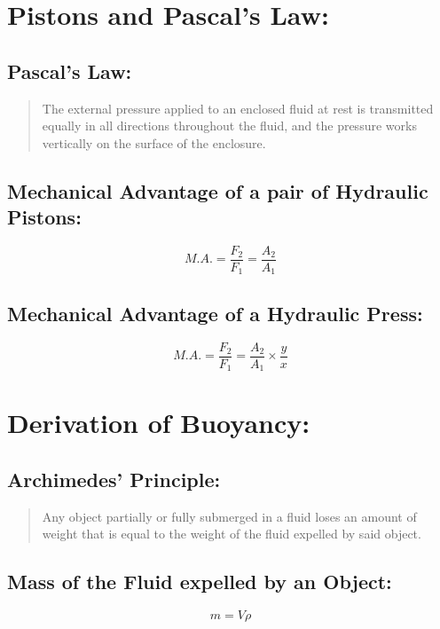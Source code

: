 \documentclass[a4paper]{report}
\begin{document}
    \section{Pistons and Pascal's Law: }
        \subsection{Pascal's Law: }
            \begin{quotation}
                The external pressure applied to an enclosed fluid at rest is transmitted equally in all directions throughout the fluid, and the pressure works vertically on the surface of the enclosure.
            \end{quotation}
        \subsection{Mechanical Advantage of a pair of Hydraulic Pistons: }
            \begin{equation}
                M.A. = \frac{F_2}{F_1} = \frac{A_2}{A_1}
            \end{equation}
        \subsection{Mechanical Advantage of a Hydraulic Press: }
            \begin{equation}
                M.A. = \frac{F_2}{F_1} = \frac{A_2}{A_1} \times \frac{y}{x}
            \end{equation}
    \section{Derivation of Buoyancy: }
        \subsection{Archimedes' Principle: }
            \begin{quotation}
                Any object partially or fully submerged in a fluid loses an amount of weight that is equal to the weight of the fluid expelled by said object.
            \end{quotation}
        \subsection{Mass of the Fluid expelled by an Object: }
            \begin{equation}
                m = V \rho
            \end{equation}
\end{document}
